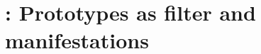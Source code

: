 \section{\todo : Prototypes as filter and manifestations} \label{sec:prototypes_filters}
\cite{lim}






